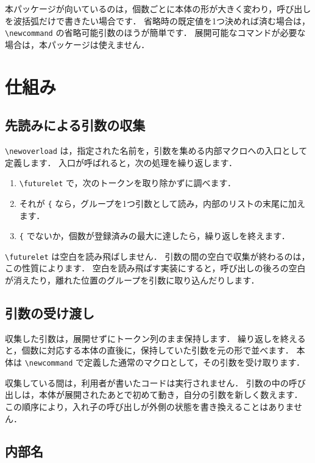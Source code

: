 \documentclass[lualatex,ja = standard,a4paper,11pt]{bxjsarticle}
\begin{document}
本パッケージが向いているのは，個数ごとに本体の形が大きく変わり，呼び出しを波括弧だけで書きたい場合です．
省略時の既定値を1つ決めれば済む場合は，\verb|\newcommand| の省略可能引数のほうが簡単です．
展開可能なコマンドが必要な場合は，本パッケージは使えません．

\section{仕組み}

\subsection{先読みによる引数の収集}

\verb|\newoverload| は，指定された名前を，引数を集める内部マクロへの入口として定義します．
入口が呼ばれると，次の処理を繰り返します．

\begin{enumerate}
\item \verb|\futurelet| で，次のトークンを取り除かずに調べます．
\item それが \verb|{| なら，グループを1つ引数として読み，内部のリストの末尾に加えます．
\item \verb|{| でないか，個数が登録済みの最大に達したら，繰り返しを終えます．
\end{enumerate}

\verb|\futurelet| は空白を読み飛ばしません．
引数の間の空白で収集が終わるのは，この性質によります．
空白を読み飛ばす実装にすると，呼び出しの後ろの空白が消えたり，離れた位置のグループを引数に取り込んだりします．

\subsection{引数の受け渡し}

収集した引数は，展開せずにトークン列のまま保持します．
繰り返しを終えると，個数に対応する本体の直後に，保持していた引数を元の形で並べます．
本体は \verb|\newcommand| で定義した通常のマクロとして，その引数を受け取ります．

収集している間は，利用者が書いたコードは実行されません．
引数の中の呼び出しは，本体が展開されたあとで初めて動き，自分の引数を新しく数えます．
この順序により，入れ子の呼び出しが外側の状態を書き換えることはありません．

\subsection{内部名}
\end{document}

